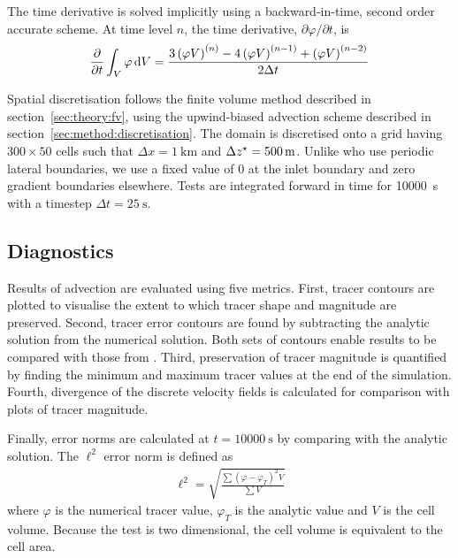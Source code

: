 The time derivative is solved implicitly using a backward-in-time, second order accurate scheme.  At time level $n$, the time derivative, $\partial \varphi / \partial t$, is \autocite{openfoam-progguide}
\begin{align}
	\frac{\partial}{\partial t} \int_V \varphi \mathop{}\!\mathrm{d} V = \frac{
		3 \left( \varphi V \right)^{(n)} - 
		4 \left( \varphi V \right)^{(n-1)} + 
		\left( \varphi V \right)^{(n-2)}
	}{2 \Delta t}
\end{align}

Spatial discretisation follows the finite volume method described in section~\ref{sec:theory:fv}, using the upwind-biased advection scheme described in section~\ref{sec:method:discretisation}.
The domain is discretised onto a grid having $300 \times 50$ cells such that $\Delta x = \SI{1}{\kilo\meter}$ and $\Delta {z^\star} = \SI{500}{\meter}$.  Unlike \textcite{schaer2002} who use periodic lateral boundaries, we use a fixed value of 0 at the inlet boundary and zero gradient boundaries elsewhere.
Tests are integrated forward in time for \SI{10000}{\second} with a timestep $\Delta t = \SI{25}{\second}$.

\subsection{Diagnostics}
Results of advection are evaluated using five metrics.  First, tracer contours are plotted to visualise the extent to which tracer shape and magnitude are preserved.  Second, tracer error contours are found by subtracting the analytic solution from the numerical solution.  Both sets of contours enable results to be compared with those from \textcite{schaer2002}.  Third, preservation of tracer magnitude is quantified by finding the minimum and maximum tracer values at the end of the simulation.  Fourth, divergence of the discrete velocity fields is calculated for comparison with plots of tracer magnitude.

Finally, error norms are calculated at $t = \SI{10000}{\second}$ by comparing with the analytic solution.  The $\ell^2$ error norm is defined as
\begin{align}
\ell^2 = \sqrt{\frac{\sum \left( \varphi - \varphi_T \right)^2 V}{\sum V}}
\end{align}
where $\varphi$ is the numerical tracer value, $\varphi_T$ is the analytic value and $V$ is the cell volume.  Because the test is two dimensional, the cell volume is equivalent to the cell area.  

